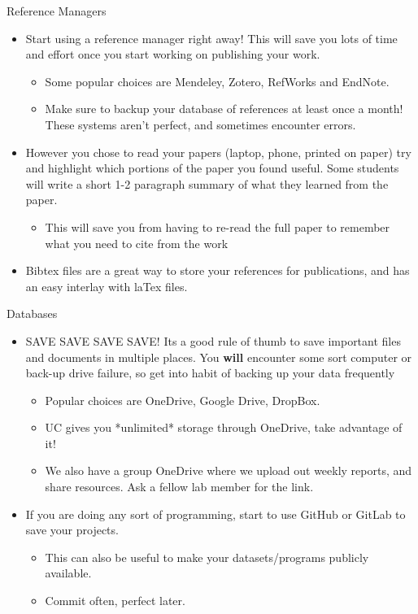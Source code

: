 \documentclass[handout]{beamer}
\begin{document}
\begin{frame}{Reference Managers}
\begin{itemize}
  \item Start using a reference manager right away! This will save you lots of time and effort once you start working on publishing your work.
  \begin{itemize}
      \item Some popular choices are Mendeley, Zotero, RefWorks and EndNote. 
      \item Make sure to backup your database of references at least once a month! These systems aren't perfect, and sometimes encounter errors.
  \end{itemize}
  \item However you chose to read your papers (laptop, phone, printed on paper) try and highlight which portions of the paper you found useful. Some students will write a short 1-2 paragraph summary of what they learned from the paper.
  \begin{itemize}
      \item This will save you from having to re-read the full paper to remember what you need to cite from the work
  \end{itemize}
  \item Bibtex files are a great way to store your references for publications, and has an easy interlay with laTex files. 
\end{itemize}
\end{frame}

\begin{frame}{Databases}
\begin{itemize}
  \item SAVE SAVE SAVE SAVE! Its a good rule of thumb to save important files and documents in multiple places. You \textbf{will} encounter some sort computer or back-up drive failure, so get into habit of backing up your data frequently
  \begin{itemize}
      \item Popular choices are OneDrive, Google Drive, DropBox.
      \item UC gives you *unlimited* storage through OneDrive, take advantage of it!
      \item We also have a group OneDrive where we upload out weekly reports, and share resources. Ask a fellow lab member for the link.
  \end{itemize}
  \item If you are doing any sort of programming, start to use GitHub or GitLab to save your projects. 
  \begin{itemize}
      \item This can also be useful to make your datasets/programs publicly available.
      \item Commit often, perfect later. 
  \end{itemize}
\end{itemize}
\end{frame}
\end{document}
